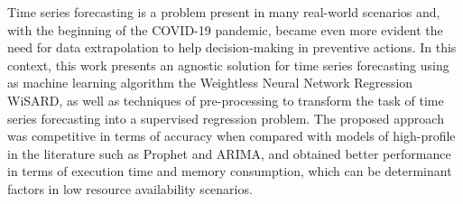\begin{foreignabstract}

Time series forecasting is a problem present in many real-world scenarios and, with the beginning of the COVID-19 pandemic, became even more evident the need for data extrapolation to help decision-making in preventive actions. In this context, this work presents an agnostic solution for time series forecasting using as machine learning algorithm the Weightless Neural Network Regression WiSARD, as well as techniques of pre-processing to transform the task of time series forecasting into a supervised regression problem. The proposed approach was competitive in terms of accuracy when compared with models of high-profile in the literature such as Prophet and ARIMA, and obtained better performance in terms of execution time and memory consumption, which can be determinant factors in low resource availability scenarios.

\end{foreignabstract}